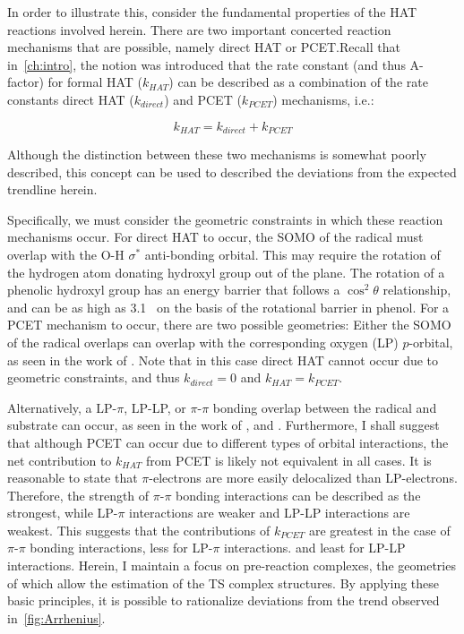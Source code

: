 In order to illustrate this, consider the fundamental properties of the HAT reactions involved herein. There are two important concerted reaction mechanisms that are possible, namely direct HAT or PCET.\@ Recall that in~\ref{ch:intro}, the notion was introduced that the rate constant (and thus A-factor) for formal HAT ($k_{HAT}$) can be described as a combination of the rate constants direct HAT ($k_{direct}$) and PCET ($k_{PCET}$) mechanisms, i.e.:

\begin{equation}
  k_{HAT} = k_{direct} + k_{PCET}
\end{equation}

\noindent Although the distinction between these two mechanisms is somewhat poorly described, this concept can be used to described the deviations from the expected trendline herein.

Specifically, we must consider the geometric constraints in which these reaction mechanisms occur. For direct HAT to occur, the SOMO of the radical must overlap with the O-H $\sigma^*$ anti-bonding orbital. This may require the rotation of the hydrogen atom donating hydroxyl group out of the plane. The rotation of a phenolic hydroxyl group has an energy barrier that follows a $\cos^2 \theta$ relationship,\cite{Kojima1960} and can be as high as 3.1 \kcalmol\ on the basis of the rotational barrier in phenol.\cite{Kim1994} For a PCET mechanism to occur, there are two possible geometries: Either the SOMO of the radical overlaps can overlap with the corresponding oxygen (LP) $p$-orbital, as seen in the work of \citet{Mayer2002}. Note that in this case direct HAT cannot occur due to geometric constraints, and thus $k_{direct} = 0$ and $k_{HAT} = k_{PCET}$.

Alternatively, a LP-$\pi$, LP-LP, or $\pi$-$\pi$ bonding overlap between the radical and substrate can occur, as seen in the work of \citet{DiLabio2005}, and \citet{DiLabio2007}. Furthermore, I shall suggest that although PCET can occur due to different types of orbital interactions, the net contribution to $k_{HAT}$ from PCET is likely not equivalent in all cases. It is reasonable to state that $\pi$-electrons are more easily delocalized than LP-electrons. Therefore, the strength of $\pi$-$\pi$ bonding interactions can be described as the strongest, while LP-$\pi$ interactions are weaker and LP-LP interactions are weakest. This suggests that the contributions of $k_{PCET}$ are greatest in the case of $\pi$-$\pi$ bonding interactions, less for LP-$\pi$ interactions. and least for LP-LP interactions. Herein, I maintain a focus on pre-reaction complexes, the geometries of which allow the estimation of the TS complex structures. By applying these basic principles, it is possible to rationalize deviations from the trend observed in~\ref{fig:Arrhenius}.

